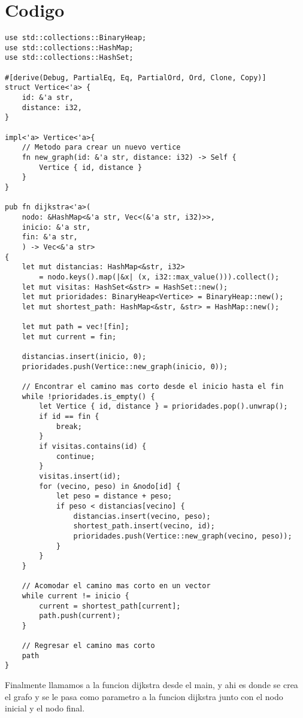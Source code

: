 \documentclass{article}
\begin{document}
\section*{Codigo}
\begin{verbatim}
use std::collections::BinaryHeap;
use std::collections::HashMap;
use std::collections::HashSet;

#[derive(Debug, PartialEq, Eq, PartialOrd, Ord, Clone, Copy)]
struct Vertice<'a> {
    id: &'a str,
    distance: i32,
}

impl<'a> Vertice<'a>{
    // Metodo para crear un nuevo vertice
    fn new_graph(id: &'a str, distance: i32) -> Self {
        Vertice { id, distance }
    }
}

pub fn dijkstra<'a>(
    nodo: &HashMap<&'a str, Vec<(&'a str, i32)>>,
    inicio: &'a str,
    fin: &'a str,
    ) -> Vec<&'a str>
{
    let mut distancias: HashMap<&str, i32>
        = nodo.keys().map(|&x| (x, i32::max_value())).collect();
    let mut visitas: HashSet<&str> = HashSet::new();
    let mut prioridades: BinaryHeap<Vertice> = BinaryHeap::new();
    let mut shortest_path: HashMap<&str, &str> = HashMap::new();

    let mut path = vec![fin];
    let mut current = fin;

    distancias.insert(inicio, 0);
    prioridades.push(Vertice::new_graph(inicio, 0));

    // Encontrar el camino mas corto desde el inicio hasta el fin
    while !prioridades.is_empty() {
        let Vertice { id, distance } = prioridades.pop().unwrap();
        if id == fin {
            break;
        }
        if visitas.contains(id) {
            continue;
        }
        visitas.insert(id);
        for (vecino, peso) in &nodo[id] {
            let peso = distance + peso;
            if peso < distancias[vecino] {
                distancias.insert(vecino, peso);
                shortest_path.insert(vecino, id);
                prioridades.push(Vertice::new_graph(vecino, peso));
            }
        }
    }

    // Acomodar el camino mas corto en un vector
    while current != inicio {
        current = shortest_path[current];
        path.push(current);
    }

    // Regresar el camino mas corto
    path
}
\end{verbatim}
Finalmente llamamos a la funcion dijkstra desde el main, y ahi es donde se crea el grafo
y se le pasa como parametro a la funcion dijkstra junto con el nodo inicial y el nodo final.
\end{document}
